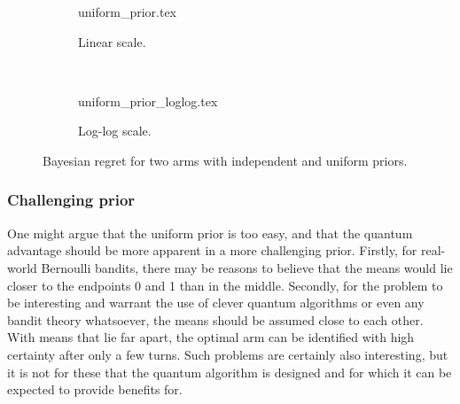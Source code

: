 \begin{figure}
    \centering
    \begin{subfigure}{\textwidth}
        \centering
        \newcommand{\myoptions}{
            width=10cm,
            height=8cm,
            xlabel={Kiloturn},
            ylabel={Regret},
            legend entries={UCB, QUCB, Thompson},
            legend pos=north west,
            legend cell align=left,
            mystyle,
            ymax = 150,
        }
        {uniform_prior.tex}
        \caption{Linear scale.}
    \end{subfigure}
    \\[3ex]
    \begin{subfigure}{\textwidth}
        \centering
        \newcommand{\myoptions}{
            width=10cm,
            height=8cm,
            xlabel={Turn},
            ylabel={Regret},
            legend entries={UCB, QUCB, Thompson},
            legend pos=north west,
            legend cell align=left,
            mystyle,
        }
        {uniform_prior_loglog.tex}
        \caption{Log-log scale.}
    \end{subfigure}
    \caption[
        Bayesian regret for two Bernoulli arms, uniform prior.
    ]
    {
        Bayesian regret for two arms with independent and uniform priors.
    }
    \label{fig:random}
\end{figure}

\clearpage


\subsubsection{Challenging prior}
One might argue that the uniform prior is too easy, and that the quantum advantage should be more apparent in a more challenging prior.
Firstly, for real-world Bernoulli bandits, there may be reasons to believe that the means would lie closer to the endpoints 0 and 1 than in the middle.
Secondly, for the problem to be interesting and warrant the use of clever quantum algorithms or even any bandit theory whatsoever, the means should be assumed close to each other.
With means that lie far apart, the optimal arm can be identified with high certainty after only a few turns.
Such problems are certainly also interesting, but it is not for these that the quantum algorithm is designed and for which it can be expected to provide benefits for.

